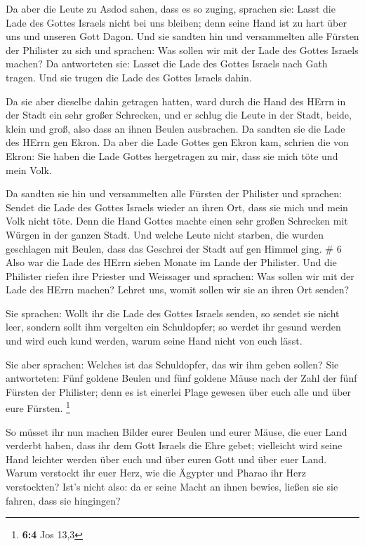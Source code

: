  Da aber die Leute zu Asdod sahen, dass es so zuging,
sprachen sie: Lasst die Lade des Gottes Israels nicht bei uns bleiben;
denn seine Hand ist zu hart über uns und unseren Gott Dagon.
 Und sie sandten hin und versammelten alle Fürsten der
Philister zu sich und sprachen: Was sollen wir mit der Lade des Gottes
Israels machen? Da antworteten sie: Lasset die Lade des Gottes Israels
nach Gath tragen. Und sie trugen die Lade des Gottes Israels dahin.

 Da sie aber dieselbe dahin getragen hatten, ward durch die
Hand des HErrn in der Stadt ein sehr großer Schrecken, und er schlug die
Leute in der Stadt, beide, klein und groß, also dass an ihnen Beulen
ausbrachen.  Da sandten sie die Lade des HErrn gen Ekron.
Da aber die Lade Gottes gen Ekron kam, schrien die von Ekron: Sie haben
die Lade Gottes hergetragen zu mir, dass sie mich töte und mein Volk.

 Da sandten sie hin und versammelten alle Fürsten der
Philister und sprachen: Sendet die Lade des Gottes Israels wieder an
ihren Ort, dass sie mich und mein Volk nicht töte. Denn die Hand Gottes
machte einen sehr großen Schrecken mit Würgen in der ganzen Stadt.
 Und welche Leute nicht starben, die wurden geschlagen mit
Beulen, dass das Geschrei der Stadt auf gen Himmel ging. \# 6
 Also war die Lade des HErrn sieben Monate im Lande der
Philister.  Und die Philister riefen ihre Priester und
Weissager und sprachen: Was sollen wir mit der Lade des HErrn machen?
Lehret uns, womit sollen wir sie an ihren Ort senden?

 Sie sprachen: Wollt ihr die Lade des Gottes Israels senden,
so sendet sie nicht leer, sondern sollt ihm vergelten ein Schuldopfer;
so werdet ihr gesund werden und wird euch kund werden, warum seine Hand
nicht von euch lässt.

 Sie aber sprachen: Welches ist das Schuldopfer, das wir ihm
geben sollen? Sie antworteten: Fünf goldene Beulen und fünf goldene
Mäuse nach der Zahl der fünf Fürsten der Philister; denn es ist einerlei
Plage gewesen über euch alle und über eure Fürsten. \footnote{\textbf{6:4}
  Jos 13,3}

 So müsset ihr nun machen Bilder eurer Beulen und eurer
Mäuse, die euer Land verderbt haben, dass ihr dem Gott Israels die Ehre
gebet; vielleicht wird seine Hand leichter werden über euch und über
euren Gott und über euer Land.  Warum verstockt ihr euer
Herz, wie die Ägypter und Pharao ihr Herz verstockten? Ist's nicht also:
da er seine Macht an ihnen bewies, ließen sie sie fahren, dass sie
hingingen?

